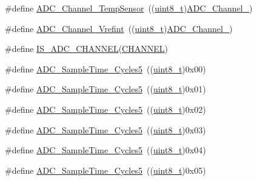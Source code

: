 \begin{DoxyCompactItemize}
\item 
\#define \hyperlink{group___a_d_c__channels_ga1efc096b8d4a8d15c4a7d91f5c03c6c7}{A\+D\+C\+\_\+\+Channel\+\_\+\+Temp\+Sensor}~((\hyperlink{_p_e___types_8h_aba7bc1797add20fe3efdf37ced1182c5}{uint8\+\_\+t})\hyperlink{openmotestm_2library_2inc_2stm32f10x__adc_8h_a52fb09ae9a0333a0e071da106466c659}{A\+D\+C\+\_\+\+Channel\+\_})
\item 
\#define \hyperlink{group___a_d_c__channels_ga5d48ded5138e6f1efe3a7634eff4d125}{A\+D\+C\+\_\+\+Channel\+\_\+\+Vrefint}~((\hyperlink{_p_e___types_8h_aba7bc1797add20fe3efdf37ced1182c5}{uint8\+\_\+t})\hyperlink{openmotestm_2library_2inc_2stm32f10x__adc_8h_a58cdfe3a5625f198116d163b09698cea}{A\+D\+C\+\_\+\+Channel\+\_})
\item 
\#define \hyperlink{group___a_d_c__channels_gaba41910dcb2b449c613a5ef638862e77}{I\+S\+\_\+\+A\+D\+C\+\_\+\+C\+H\+A\+N\+N\+EL}(\hyperlink{samr21__xpro_200std__low__power__mode_200std__low__power__mode_8c_ace6a11e892466500d47d1f45f042bc53}{C\+H\+A\+N\+N\+EL})
\item 
\#define \hyperlink{group___a_d_c__sampling__time_gad085065e48857ada890863a7db575c6e}{A\+D\+C\+\_\+\+Sample\+Time\+\_\+Cycles5}~((\hyperlink{_p_e___types_8h_aba7bc1797add20fe3efdf37ced1182c5}{uint8\+\_\+t})0x00)
\item 
\#define \hyperlink{group___a_d_c__sampling__time_gac4101073619c4d79efa28a477696b3f5}{A\+D\+C\+\_\+\+Sample\+Time\+\_\+Cycles5}~((\hyperlink{_p_e___types_8h_aba7bc1797add20fe3efdf37ced1182c5}{uint8\+\_\+t})0x01)
\item 
\#define \hyperlink{group___a_d_c__sampling__time_gaef37e223e826ac5e6ee5ef30881f9b27}{A\+D\+C\+\_\+\+Sample\+Time\+\_\+Cycles5}~((\hyperlink{_p_e___types_8h_aba7bc1797add20fe3efdf37ced1182c5}{uint8\+\_\+t})0x02)
\item 
\#define \hyperlink{group___a_d_c__sampling__time_ga6251e64783f7a6562e17e71f7edd68d8}{A\+D\+C\+\_\+\+Sample\+Time\+\_\+Cycles5}~((\hyperlink{_p_e___types_8h_aba7bc1797add20fe3efdf37ced1182c5}{uint8\+\_\+t})0x03)
\item 
\#define \hyperlink{group___a_d_c__sampling__time_gadc3d26f9bf5fa6589889cc938c66e0e7}{A\+D\+C\+\_\+\+Sample\+Time\+\_\+Cycles5}~((\hyperlink{_p_e___types_8h_aba7bc1797add20fe3efdf37ced1182c5}{uint8\+\_\+t})0x04)
\item 
\#define \hyperlink{group___a_d_c__sampling__time_ga6a6fbbadc0e35a719fb749bf6b0704d6}{A\+D\+C\+\_\+\+Sample\+Time\+\_\+Cycles5}~((\hyperlink{_p_e___types_8h_aba7bc1797add20fe3efdf37ced1182c5}{uint8\+\_\+t})0x05)

\end{DoxyCompactItemize}
